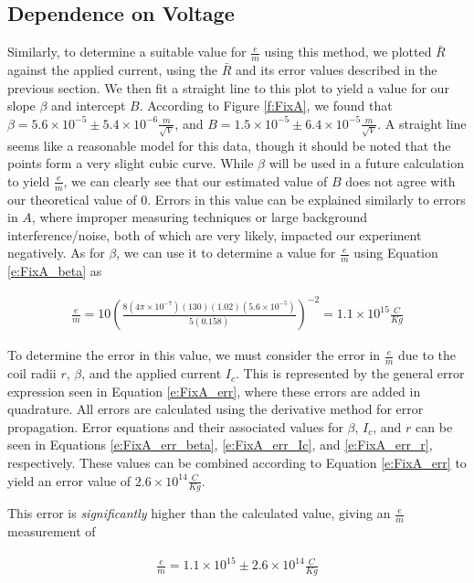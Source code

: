 \documentclass[12pt]{article}
\newcommand{\paren}[1]{\left( {#1} \right)}
\begin{document}
\subsection{Dependence on Voltage}
Similarly, to determine a suitable value for $\frac{e}{m}$ using this method, we plotted $\bar{R}$ against the applied current, using the $\bar{R}$ and its error values described in the previous section. We then fit a straight line to this plot to yield a value for our slope $\beta$ and intercept $B$. According to Figure \ref{f:FixA}, we found that $\beta=5.6\times10^{-5}\pm5.4\times10^{-6}\frac{m}{\sqrt{V}}$, and $B=1.5\times10^{-5}\pm6.4\times10^{-5}\frac{m}{\sqrt{V}}$. A straight line seems like a reasonable model for this data, though it should be noted that the points form a very slight cubic curve. While $\beta$ will be used in a future calculation to yield $\frac{e}{m}$, we can clearly see that our estimated value of $B$ does not agree with our theoretical value of 0. Errors in this value can be explained similarly to errors in $A$, where improper measuring techniques or large background interference/noise, both of which are very likely, impacted our experiment negatively. As for $\beta$, we can use it to determine a value for $\frac{e}{m}$ using Equation \ref{e:FixA_beta} as

\begin{align*}
	\frac{e}{m}=10\paren{\frac{8(4\pi\times10^{-7})(130)(1.02)(5.6\times10^{-5})}{5(0.158)}}^{-2}=1.1\times10^{15}\frac{C}{Kg}
\end{align*}

To determine the error in this value, we must consider the error in $\frac{e}{m}$ due to the coil radii $r$, $\beta$, and the applied current $I_c$. This is represented by the general error expression seen in Equation \ref{e:FixA_err}, where these errors are added in quadrature. All errors are calculated using the derivative method for error propagation. Error equations and their associated values for $\beta$, $I_c$, and $r$ can be seen in Equations \ref{e:FixA_err_beta}, \ref{e:FixA_err_Ic}, and \ref{e:FixA_err_r}, respectively. These values can be combined according to Equation \ref{e:FixA_err} to yield an error value of $2.6\times10^{14} \frac{C}{Kg}$.

This error is \textit{significantly} higher than the calculated value, giving an $\frac{e}{m}$ measurement of 

\begin{align*}
	\frac{e}{m}=1.1\times10^{15}\pm2.6\times10^{14} \frac{C}{Kg}
\end{align*}
\end{document}
